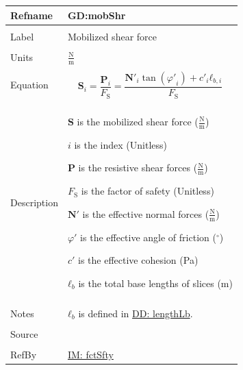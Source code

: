 \documentclass[12pt]{article}
\begin{document}
\vspace{\baselineskip}
\noindent
\begin{minipage}{\textwidth}
\begin{tabular}{>{\raggedright}p{}>{\raggedright\arraybackslash}p{}}
\toprule \textbf{Refname} & \textbf{GD:mobShr}
\label{GD:mobShr}
\\ \midrule \\
Label & Mobilized shear force
        
\\ \midrule \\
Units & $\frac{\text{N}}{\text{m}}$
        
\\ \midrule \\
Equation & \begin{displaymath}
           {\mathbf{S}}_{i}=\frac{{\mathbf{P}}_{i}}{{F_{\text{S}}}}=\frac{{\mathbf{N'}}_{i} \tan\left({φ'}_{i}\right)+{c'}_{i} {\mathbf{ℓ}_{b,i}}}{{F_{\text{S}}}}
           \end{displaymath}
\\ \midrule \\
Description & \begin{symbDescription}
              \item{$\mathbf{S}$ is the mobilized shear force ($\frac{\text{N}}{\text{m}}$)}
              \item{$i$ is the index (Unitless)}
              \item{$\mathbf{P}$ is the resistive shear forces ($\frac{\text{N}}{\text{m}}$)}
              \item{${F_{\text{S}}}$ is the factor of safety (Unitless)}
              \item{$\mathbf{N'}$ is the effective normal forces ($\frac{\text{N}}{\text{m}}$)}
              \item{$φ'$ is the effective angle of friction (${}^{\circ}$)}
              \item{$c'$ is the effective cohesion (Pa)}
              \item{${\mathbf{ℓ}_{b}}$ is the total base lengths of slices (m)}
              \end{symbDescription}
\\ \midrule \\
Notes & ${\mathbf{ℓ}_{b}}$ is defined in \hyperref[DD:lengthLb]{DD: lengthLb}.
        
\\ \midrule \\
Source & \cite{chen2005}
         
\\ \midrule \\
RefBy & \hyperref[IM:fctSfty]{IM: fctSfty}
        
\\ \bottomrule
\end{tabular}
\end{minipage}
\end{document}
